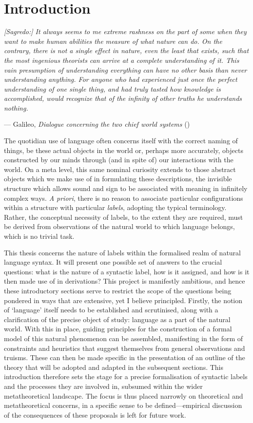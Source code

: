 \section{Introduction}\label{sec:100}
\epigraph{\itshape [Sagredo:] It always seems to me extreme rashness on the part of some when they want to make human abilities the measure of what nature can do. On the contrary, there is not a single effect in nature, even the least that exists, such that the most ingenious theorists can arrive at a complete understanding of it. This vain presumption of understanding everything can have no other basis than never understanding anything. For anyone who had experienced just once the perfect understanding of one single thing, and had truly tasted how knowledge is accomplished, would recognize that of the infinity of other truths he understands nothing.}{--- Galileo, \textit{Dialogue concerning the two chief world systems} (\citeyear[101]{Galileo_1967})}

The quotidian use of language often concerns itself with the correct naming of things, be these actual objects in the world or, perhaps more accurately, objects constructed by our minds through (and in spite of) our interactions with the world. On a meta level, this same nominal curiosity extends to those abstract objects which we make use of in formulating these descriptions, the invisible structure which allows sound and sign to be associated with meaning in infinitely complex ways. \textit{A priori}, there is no reason to associate particular configurations within a structure with particular \textit{labels}, adopting the typical terminology. Rather, the conceptual necessity of labels, to the extent they are required, must be derived from observations of the natural world to which language belongs, which is no trivial task.

This thesis concerns the nature of labels within the formalised realm of natural language syntax. It will present one possible set of answers to the crucial questions: what is the nature of a syntactic label, how is it assigned, and how is it then made use of in derivations? This project is manifestly ambitious, and hence these introductory sections serve to restrict the scope of the questions being pondered in ways that are extensive, yet I believe principled. Firstly, the notion of `language' itself needs to be established and scrutinised, along with a clarification of the precise object of study: language as a part of the natural world. With this in place, guiding principles for the construction of a formal model of this natural phenomenon can be assembled, manifesting in the form of constraints and heuristics that suggest themselves from general observations and truisms. These can then be made specific in the presentation of an outline of the theory that will be adopted and adapted in the subsequent sections. This introduction therefore sets the stage for a precise formalisation of syntactic labels and the processes they are involved in, subsumed within the wider metatheoretical landscape. The focus is thus placed narrowly on theoretical and metatheoretical concerns, in a specific sense to be defined---empirical discussion of the consequences of these proposals is left for future work.












